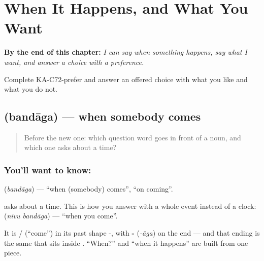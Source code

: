 
\chapter{When It Happens, and What You Want}
\label{ch:ka-when-and-want}

\begin{chapteropening}
\textbf{By the end of this chapter:} \emph{I can say when something happens, say what I want, and answer a choice with a preference.}

Complete KA-C72-prefer and answer an offered choice with what you like and what you do not.
\end{chapteropening}

\section[\texorpdfstring{\kn{ಬಂದಾಗ} (bandāga)}{ಬಂದಾಗ (bandāga)}]{ (bandāga) — when somebody comes}

\label{lesson:KA-C72-when-clause}



\begin{quote}
Before the new one: which question word goes in front of a noun, and which one asks about a time?
\end{quote}

\subsection*{You'll want to know: }
\textbf{} (\emph{bandāga}) — \textquotedblleft{}when (somebody) comes\textquotedblright{}, \textquotedblleft{}on coming\textquotedblright{}.

 asks about a time. This is how you answer with a whole event instead of a clock: \textbf{ } (\emph{nīvu bandāga}) — \textquotedblleft{}when you come\textquotedblright{}.

It is  /  (\textquotedblleft{}come\textquotedblright{}) in its past shape -, with \textbf{-} (\emph{-āga}) on the end — and that ending is the same  that sits inside . \textquotedblleft{}When?\textquotedblright{} and \textquotedblleft{}when it happens\textquotedblright{} are built from one piece.

